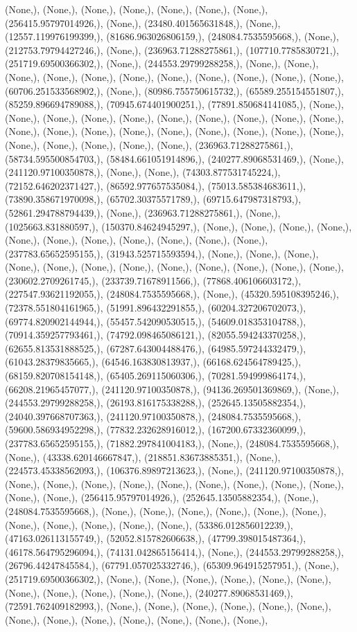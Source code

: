 \documentclass{article}
\begin{document}
(None,), (None,), (None,), (None,), (None,), (None,), (None,), (256415.95797014926,), (None,), (23480.401565631848,), (None,), (12557.119976199399,), (81686.963026806159,), (248084.7535595668,), (None,), (212753.79794427246,), (None,), (236963.71288275861,), (107710.7785830721,), (251719.69500366302,), (None,), (244553.29799288258,), (None,), (None,), (None,), (None,), (None,), (None,), (None,), (None,), (None,), (None,), (None,), (60706.251533568902,), (None,), (80986.755750615732,), (65589.255154551807,), (85259.896694789088,), (70945.674401900251,), (77891.850684141085,), (None,), (None,), (None,), (None,), (None,), (None,), (None,), (None,), (None,), (None,), (None,), (None,), (None,), (None,), (None,), (None,), (None,), (None,), (None,), (None,), (None,), (None,), (None,), (None,), (236963.71288275861,), (58734.595500854703,), (58484.661051914896,), (240277.89068531469,), (None,), (241120.97100350878,), (None,), (None,), (74303.877531745224,), (72152.646202371427,), (86592.977657535084,), (75013.585384683611,), (73890.358671970098,), (65702.30375571789,), (69715.647987318793,), (52861.294788794439,), (None,), (236963.71288275861,), (None,), (1025663.831880597,), (150370.84624945297,), (None,), (None,), (None,), (None,), (None,), (None,), (None,), (None,), (None,), (None,), (None,), (237783.65652595155,), (31943.525715593594,), (None,), (None,), (None,), (None,), (None,), (None,), (None,), (None,), (None,), (None,), (None,), (None,), (230602.2709261745,), (233739.71678911566,), (77868.406106603172,), (227547.93621192055,), (248084.7535595668,), (None,), (45320.595108395246,), (72378.551804161965,), (51991.896432291855,), (60204.327206702073,), (69774.820902144944,), (55457.542090530515,), (54609.018353104788,), (70914.359257793461,), (74792.098465086121,), (82055.594243370258,), (62655.813531888525,), (67287.643004488476,), (64985.597244332479,), (61043.28379835665,), (64546.163830813937,), (66168.624564789425,), (68159.820708154148,), (65405.269115060306,), (70281.594999864174,), (66208.21965457077,), (241120.97100350878,), (94136.269501369869,), (None,), (244553.29799288258,), (26193.816175338288,), (252645.13505882354,), (24040.397668707363,), (241120.97100350878,), (248084.7535595668,), (59600.586934952298,), (77832.232628916012,), (167200.67332360099,), (237783.65652595155,), (71882.297841004183,), (None,), (248084.7535595668,), (None,), (43338.620146667847,), (218851.83673885351,), (None,), (224573.45338562093,), (106376.89897213623,), (None,), (241120.97100350878,), (None,), (None,), (None,), (None,), (None,), (None,), (None,), (None,), (None,), (None,), (None,), (256415.95797014926,), (252645.13505882354,), (None,), (248084.7535595668,), (None,), (None,), (None,), (None,), (None,), (None,), (None,), (None,), (None,), (None,), (None,), (53386.012856012239,), (47163.026113155749,), (52052.815782606638,), (47799.398015487364,), (46178.564795296094,), (74131.042865156414,), (None,), (244553.29799288258,), (26796.44247845584,), (67791.057025332746,), (65309.964915257951,), (None,), (251719.69500366302,), (None,), (None,), (None,), (None,), (None,), (None,), (None,), (None,), (None,), (None,), (None,), (240277.89068531469,), (72591.762409182993,), (None,), (None,), (None,), (None,), (None,), (None,), (None,), (None,), (None,), (None,), (None,), (None,), (None,), 
\end{document}
